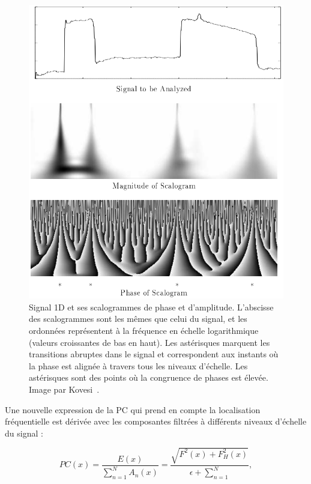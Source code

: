 \bigskip

\begin{figure}
    \centering
    \includegraphics[width=.85\textwidth]{contenu/resources/images/phase_congruence_scalogram}
    \caption[Scalogramme d'un signal mettant en évidence des points caractéristiques du signal]{Signal 1D et ses scalogrammes de phase et d'amplitude. L'abscisse des scalogrammes sont les mêmes que celui du signal, et les ordonnées représentent à la fréquence en échelle logarithmique (valeurs croissantes de bas en haut). Les astérisques marquent les transitions abruptes dans le signal et correspondent aux instants où la phase est alignée à travers tous les niveaux d'échelle. Les astérisques sont des points où la congruence de phases est élevée. Image par Kovesi~\cite{kovesi_image_1995}.}
    \label{fig:phase-congruence-scalogram}
\end{figure}

Une nouvelle expression de la PC qui prend en compte la localisation fréquentielle est dérivée avec les composantes filtrées à différents niveaux d'échelle du signal :

\begin{equation}
    PC(x) = \frac{E(x)}{\sum_{n=1}^{N} A_n(x)} = \frac{\sqrt{F^2(x)+F_H^2(x)}}{\epsilon + \sum_{n=1}^{N}},
\end{equation}

